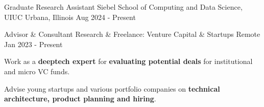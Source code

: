 

\begin{cventries}


  \cventry
    {Graduate Research Assistant} %
    {Siebel School of Computing and Data Science, UIUC} %
    {Urbana, Illinois} %
    {Aug 2024 - Present} %
    {
      \begin{cvitems} %
      \item %
      \item %
      \item %
      \end{cvitems}
    }


  \cventry
    {Advisor \& Consultant} %
    {Research \& Freelance: Venture Capital \& Startups} %
    {Remote} %
    {Jan 2023 - Present} %
    {
      \begin{cvitems} %
      \item {Work as a \textbf{deeptech expert} for \textbf{evaluating potential deals} for institutional and micro VC funds.}
      \item {Advise young startups and various portfolio companies on \textbf{technical architecture, product planning and hiring}.}
      \end{cvitems}
    }



\end{cventries}
